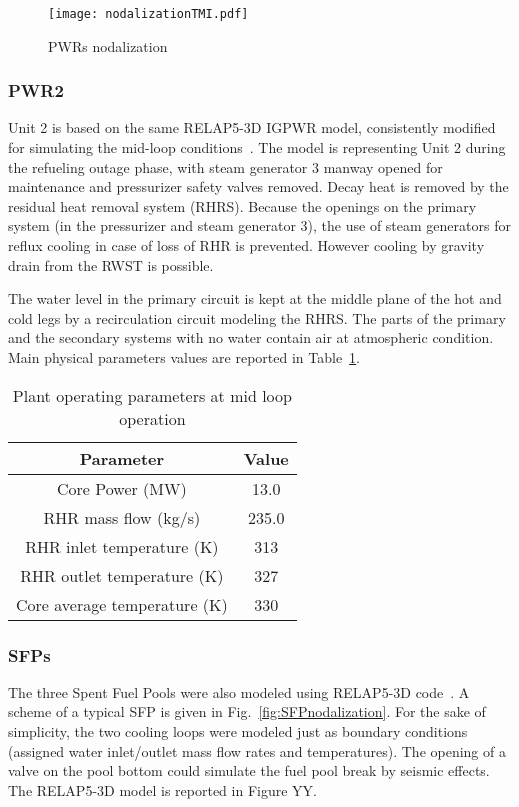 \begin{figure}
    \centering
    \texttt{[image: nodalizationTMI.pdf]}
    \caption{PWRs nodalization}
    \label{fig:PWRnodalization}
\end{figure}

\subsubsection{PWR2}
Unit 2 is based on the same RELAP5-3D IGPWR model, consistently modified for simulating the 
mid-loop conditions~\cite{NUREGCR6144}. The model is representing Unit 2 
during the refueling outage phase, with steam generator 3 manway opened for maintenance and pressurizer safety 
valves removed. Decay heat is removed by the residual heat removal system (RHRS). Because the 
openings on the primary system (in the pressurizer and steam generator 3), the use of steam generators 
for reflux cooling in case 
of loss of RHR is prevented. However cooling by gravity drain from the RWST is possible.

The water level in the primary circuit is kept at the middle plane of the hot and cold legs 
by a recirculation circuit modeling the RHRS. 
The parts of the primary and the secondary systems with no water contain air at atmospheric condition.  
Main physical parameters values are reported in Table~\ref{tab:midLoopParamteres}.

\begin{table}
   \centering
  \begin{tabular}{|c|c|}
     \hline
     \textbf{Parameter}           & \textbf{Value}   \\ \hline \hline
     Core Power (MW)              & 13.0    \\ \hline
     RHR mass flow (kg/s)         & 235.0   \\ \hline
     RHR inlet temperature (K)    & 313     \\ \hline
     RHR outlet temperature (K)   & 327     \\ \hline
     Core average temperature (K) & 330     \\ \hline
  \end{tabular}
  \caption{Plant operating parameters at mid loop operation}
  \label{tab:midLoopParamteres}
\end{table} 

\subsubsection{SFPs}
The three Spent Fuel Pools were also modeled using RELAP5-3D code~\cite{parisiExternalAnalysis}. 
A scheme of a typical SFP is given in Fig.~\ref{fig:SFPnodalization}. 
For the sake of simplicity, the two cooling loops were modeled just as boundary conditions 
(assigned water inlet/outlet mass flow rates and temperatures). The opening of a valve on the pool bottom
could simulate the fuel pool break by seismic effects. The RELAP5-3D model is reported in Figure YY.

